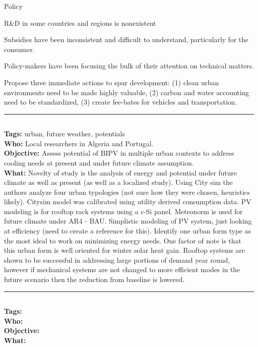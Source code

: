 \documentclass[11pt,a4paper]{article}
\newenvironment{itemize*}%
  {\begin{itemize}[rightmargin=\dimexpr\linewidth-120mm-\leftmargin\relax]%
    \setlength{\itemsep}{0pt}%
    \setlength{\parskip}{0pt}}%
  {\end{itemize}}
\begin{document}
Policy
\begin{itemize*}
    \item R\&D in some countries and regions is nonexistent
    \item Subsidies have been inconsistent and difficult to understand, particularly for the consumer.
    \item Policy-makers have been focusing the bulk of their attention on technical matters. 
    \item 
\end{itemize*}

Propose three immediate actions to spur development: (1) clean urban environments need to be made highly valuable, (2) carbon and water accounting need to be standardized, (3) create fee-bates for vehicles and transportation.

\noindent\rule{\textwidth}{1pt}
\subsection*{}
\textbf{Tags:} urban, future weather, potentials \\
\textbf{Who:} Local researchers in Algeria and Portugal. \\
\textbf{Objective:} Assess potential of  BIPV in multiple urban contexts to address cooling needs at present and under future climate assumption. \\
\textbf{What:} Novelty of study is the analysis of energy and potential under future climate as well as present (as well as a localized study). Using City sim the authors analyze four urban typologies (not sure how they were chosen, heuristics likely). Citysim model was calibrated using utility derived consumption data. PV modeling is for rooftop rack systems using a c-Si panel. Meteonorm is used for future climate under AR4 - BAU. Simplistic modeling of PV system, just looking at efficiency (need to create a reference for this). Identify one urban form type as the most ideal to work on minimizing energy needs. One factor of note is that this urban form is well oriented for winter solar heat gain. Rooftop systems are shown to be successful in addressing large portions of demand year round, however if mechanical systems are not changed to more efficient modes in the future scenario then the reduction from baseline is lowered.

\noindent\rule{\textwidth}{1pt}
\subsection*{\bibentry{}}
\textbf{Tags:}  \\
\textbf{Who:}  \\
\textbf{Objective:}  \\
\textbf{What:} 


\end{document}
